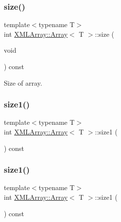 \subsubsection{\texorpdfstring{size()}{size()}\hspace{0.1cm}{\footnotesize\ttfamily [3/3]}}
{\footnotesize\ttfamily template$<$typename T$>$ \\
int \mbox{\hyperlink{classXMLArray_1_1Array}{X\+M\+L\+Array\+::\+Array}}$<$ T $>$\+::size (\begin{DoxyParamCaption}\item[{void}]{ }\end{DoxyParamCaption}) const\hspace{0.3cm}{\ttfamily [inline]}}



Size of array. 

\mbox{\label{classXMLArray_1_1Array_a33e863988af56d045439d31058088c8c}} 
\subsubsection{\texorpdfstring{size1()}{size1()}\hspace{0.1cm}{\footnotesize\ttfamily [1/3]}}
{\footnotesize\ttfamily template$<$typename T$>$ \\
int \mbox{\hyperlink{classXMLArray_1_1Array}{X\+M\+L\+Array\+::\+Array}}$<$ T $>$\+::size1 (\begin{DoxyParamCaption}{ }\end{DoxyParamCaption}) const\hspace{0.3cm}{\ttfamily [inline]}}

\mbox{\label{classXMLArray_1_1Array_a33e863988af56d045439d31058088c8c}} 
\subsubsection{\texorpdfstring{size1()}{size1()}\hspace{0.1cm}{\footnotesize\ttfamily [2/3]}}
{\footnotesize\ttfamily template$<$typename T$>$ \\
int \mbox{\hyperlink{classXMLArray_1_1Array}{X\+M\+L\+Array\+::\+Array}}$<$ T $>$\+::size1 (\begin{DoxyParamCaption}{ }\end{DoxyParamCaption}) const\hspace{0.3cm}{\ttfamily [inline]}}

